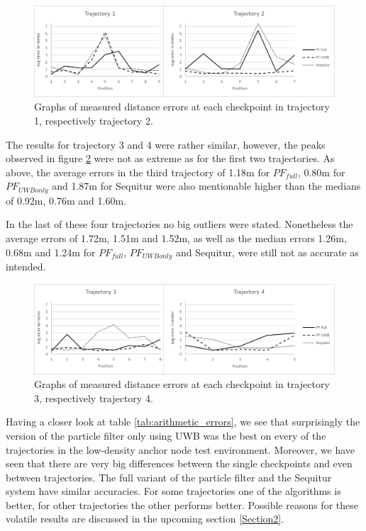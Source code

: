 \begin{figure}[th]
\centering
\includegraphics[width=1.0\textwidth]{Figures/trajectory1_2_results}
\decoRule
\caption[Positioning results trajectory 1 and 2]{Graphs of measured distance errors at each checkpoint in trajectory 1, respectively trajectory 2.}
\label{fig:trajectory1and2_results}
\end{figure}

The results for trajectory 3 and 4 were rather similar, however, the peaks observed in figure \ref{fig:trajectory3and4_results} were not as extreme as for the first two trajectories. As above, the average errors in the third trajectory of 1.18m for $PF_{full}$, 0.80m for $PF_{UWBonly}$ and 1.87m for Sequitur were also mentionable higher than the medians of 0.92m, 0.76m and 1.60m.

In the last of these four trajectories no big outliers were stated. Nonetheless the average errors of 1.72m, 1.51m and 1.52m, as well as the median errors 1.26m, 0.68m and 1.24m for $PF_{full}$, $PF_{UWBonly}$ and Sequitur, were still not as accurate as intended.

\begin{figure}[th]
\centering
\includegraphics[width=1.0\textwidth]{Figures/trajectory3_4_results}
\decoRule
\caption[Positioning results trajectory 3 and 4]{Graphs of measured distance errors at each checkpoint in trajectory 3, respectively trajectory 4.}
\label{fig:trajectory3and4_results}
\end{figure}

Having a closer look at table \ref{tab:arithmetic_errors}, we see that surprisingly the version of the particle filter only using UWB was the best on every of the trajectories in the low-density anchor node test environment. Moreover, we have seen that there are very big differences between the single checkpoints and even between trajectories. The full variant of the particle filter and the Sequitur system have similar accuracies. For some trajectories one of the algorithms is better, for other trajectories the other performs better. Possible reasons for these volatile results are discussed in the upcoming section \ref{Section2}. 

